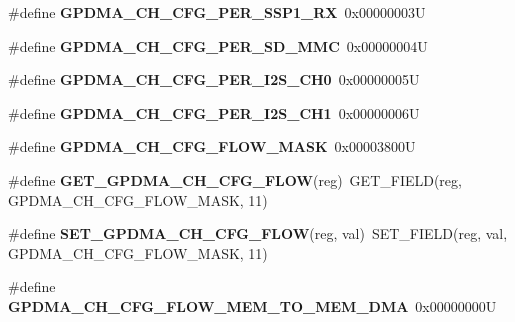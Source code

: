 \begin{DoxyCompactItemize}
\#define {\bfseries G\+P\+D\+M\+A\+\_\+\+C\+H\+\_\+\+C\+F\+G\+\_\+\+P\+E\+R\+\_\+\+S\+S\+P1\+\_\+\+RX}~0x00000003U
\item 
\mbox{\label{group__lpc24xx__regs_ga308ebcca14943425f917b4f693f64351}} 
\#define {\bfseries G\+P\+D\+M\+A\+\_\+\+C\+H\+\_\+\+C\+F\+G\+\_\+\+P\+E\+R\+\_\+\+S\+D\+\_\+\+M\+MC}~0x00000004U
\item 
\mbox{\label{group__lpc24xx__regs_ga4d891af6536e438a67129614ce31094e}} 
\#define {\bfseries G\+P\+D\+M\+A\+\_\+\+C\+H\+\_\+\+C\+F\+G\+\_\+\+P\+E\+R\+\_\+\+I2\+S\+\_\+\+C\+H0}~0x00000005U
\item 
\mbox{\label{group__lpc24xx__regs_ga33feb3d16219235077ef65c4036af125}} 
\#define {\bfseries G\+P\+D\+M\+A\+\_\+\+C\+H\+\_\+\+C\+F\+G\+\_\+\+P\+E\+R\+\_\+\+I2\+S\+\_\+\+C\+H1}~0x00000006U
\item 
\mbox{\label{group__lpc24xx__regs_gaec698fb04b4cfb6663df483e96c2ab30}} 
\#define {\bfseries G\+P\+D\+M\+A\+\_\+\+C\+H\+\_\+\+C\+F\+G\+\_\+\+F\+L\+O\+W\+\_\+\+M\+A\+SK}~0x00003800U
\item 
\mbox{\label{group__lpc24xx__regs_gac0622c6c29f7b9ae24ca93143aa958d8}} 
\#define {\bfseries G\+E\+T\+\_\+\+G\+P\+D\+M\+A\+\_\+\+C\+H\+\_\+\+C\+F\+G\+\_\+\+F\+L\+OW}(reg)~G\+E\+T\+\_\+\+F\+I\+E\+LD(reg, G\+P\+D\+M\+A\+\_\+\+C\+H\+\_\+\+C\+F\+G\+\_\+\+F\+L\+O\+W\+\_\+\+M\+A\+SK, 11)
\item 
\mbox{\label{group__lpc24xx__regs_gad84676e5c2bd40eba10d29aa1dde8195}} 
\#define {\bfseries S\+E\+T\+\_\+\+G\+P\+D\+M\+A\+\_\+\+C\+H\+\_\+\+C\+F\+G\+\_\+\+F\+L\+OW}(reg,  val)~S\+E\+T\+\_\+\+F\+I\+E\+LD(reg, val, G\+P\+D\+M\+A\+\_\+\+C\+H\+\_\+\+C\+F\+G\+\_\+\+F\+L\+O\+W\+\_\+\+M\+A\+SK, 11)
\item 
\mbox{\label{group__lpc24xx__regs_ga01a7bac20917b5df3216a8ced8167265}} 
\#define {\bfseries G\+P\+D\+M\+A\+\_\+\+C\+H\+\_\+\+C\+F\+G\+\_\+\+F\+L\+O\+W\+\_\+\+M\+E\+M\+\_\+\+T\+O\+\_\+\+M\+E\+M\+\_\+\+D\+MA}~0x00000000U
\item 
\mbox{\label{group__lpc24xx__regs_ga2a58d17810d2213b010f5a4c61540d3a}} 

\end{DoxyCompactItemize}
